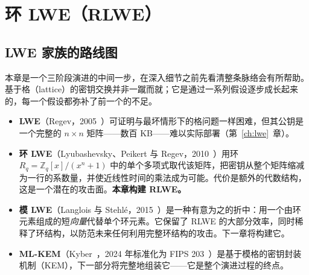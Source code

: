 \chapter{环 LWE（RLWE）}
\label{ch:rlwe}

\section{LWE 家族的路线图}

本章是一个三阶段演进的中间一步，在深入细节之前先看清整条脉络会有所帮助。基于格（lattice）的密钥交换并非一蹴而就；它是通过一系列假设逐步成长起来的，每一个假设都弥补了前一个的不足。

\begin{center}
\end{center}

\begin{itemize}
  \item \textbf{LWE}（Regev，2005~\cite{regev2009}）可证明与最坏情形下的格问题一样困难，但其公钥是一个完整的 $n\times n$ 矩阵——数百 KB——难以实际部署（第~\ref{ch:lwe}~章）。
  \item \textbf{环 LWE}（Lyubashevsky、Peikert 与 Regev，2010~\cite{lpr2010}）用环 $R_q=\mathbb{Z}_q[x]/(x^n+1)$ 中的单个多项式取代该矩阵，把密钥从整个矩阵缩减为一行的系数量，并使近线性时间的乘法成为可能。代价是额外的代数结构，这是一个潜在的攻击面。\textbf{本章构建 RLWE。}
  \item \textbf{模 LWE}（Langlois 与 Stehl\'e，2015~\cite{langlois2015}）是一种有意为之的折中：用一个由环元素组成的短\emph{向量}代替单个环元素。它保留了 RLWE 的大部分效率，同时稀释了环结构，以防范未来任何利用完整环结构的攻击。下一章将构建它。
  \item \textbf{ML-KEM}（Kyber~\cite{kyber2018}，2024 年标准化为 FIPS 203~\cite{fips203}）是基于模格的密钥封装机制（KEM），下一部分将完整地组装它——它是整个演进过程的终点。
\end{itemize}

